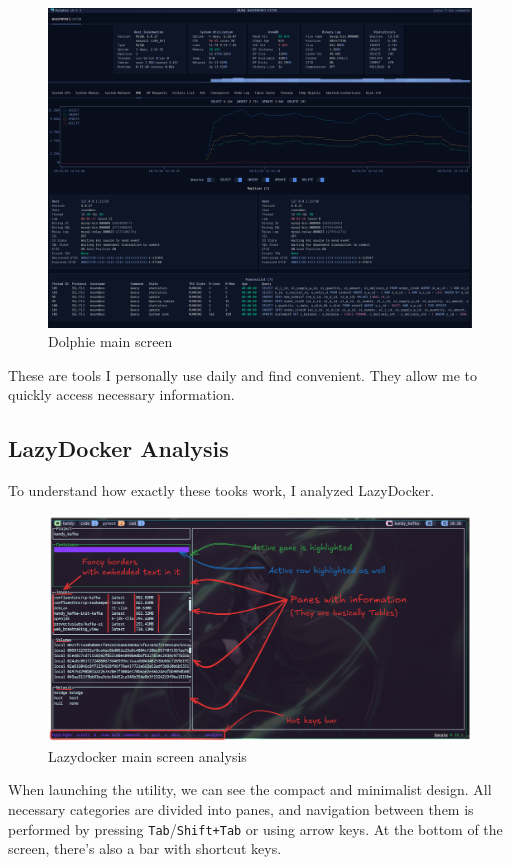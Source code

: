\documentclass[10pt , a4paper]{report}
\begin{document}
\begin{figure}[htbp]
    \centering
    \includegraphics[width=.7\linewidth]{imgs/Dolphie.png}
    \caption{Dolphie main screen}
    \label{fig:enter-label}
\end{figure}

These are tools I personally use daily and find convenient. They allow me to quickly access necessary information. 

\subsection{LazyDocker Analysis}\label{subsec:ld_analysis}

To understand how exactly these tooks work, I analyzed LazyDocker.

\begin{figure}[htbp]
    \centering
    \includegraphics[width=.9\linewidth]{imgs/LazyDockerAnalysis.png}
    \caption{Lazydocker main screen analysis}
    \label{fig:lazydocker_analysis}
\end{figure}

When launching the utility, we can see the compact and minimalist design. All necessary categories are divided into panes, and navigation between them is performed by pressing \texttt{Tab}/\texttt{Shift+Tab} or using arrow keys. At the bottom of the screen, there’s also a bar with shortcut keys.
\end{document}
